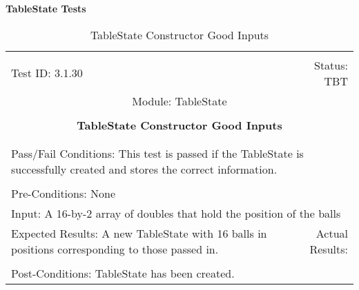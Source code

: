 \documentclass[titlepage]{article}
\begin{document}
\large{\textbf{TableState Tests}}
\begin{center}%
\begin{table}
\begin{tabular}{|l r|}\hline&\\[-2mm]
	Test ID: 3.1.30	&Status: TBT\\[-3mm]
	\multicolumn{2}{|c|}{Module: TableState}\\&\\
	\multicolumn{2}{|c|}{\textbf{\large{TableState Constructor Good Inputs}}}\\&\\\hline&\\[-3mm]
	\multicolumn{2}{|p{\textwidth}|}{Pass/Fail Conditions: This test is passed if the TableState is successfully created and stores the correct information.}\\[1mm]\hline&\\[-3mm]
	\multicolumn{2}{|p{\textwidth}|}{Pre-Conditions: None}\\[4mm]
	\multicolumn{2}{|p{\textwidth}|}{Input: A 16-by-2 array of doubles that hold the position of the balls}\\[2mm]\hline
	\multicolumn{1}{|p{0.49\textwidth}}{Expected Results: A new TableState with 16 balls in positions corresponding to those passed in.}	&\multicolumn{1}{|p{0.45\textwidth}|}{Actual Results: }\\\hline&\\[-3mm]
	\multicolumn{2}{|p{\textwidth}|}{Post-Conditions: TableState has been created.}\\\hline
\end{tabular}
\caption{TableState Constructor Good Inputs}
\end{table}
\end{center}
\end{document}
